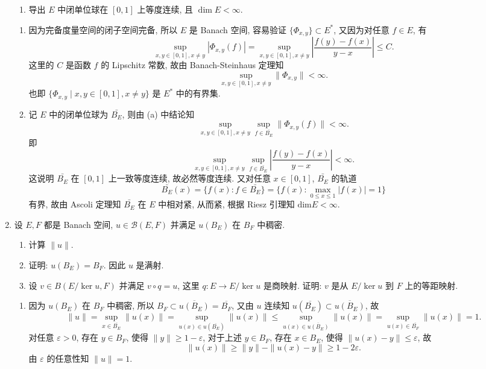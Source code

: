 \begin{enumerate}
\begin{enumerate}
      \item 导出 $E$ 中闭单位球在 $[0,1]$ 上等度连续, 且 $\dim E<\infty$.
    \end{enumerate}
    \begin{answer}
      \begin{enumerate}
        \item 因为完备度量空间的闭子空间完备, 所以 $E$ 是 Banach 空间,
        容易验证 $\{\varPhi_{x,y}\}\subset E^*$, 又因为对任意 $f\in E$, 有
        \[\sup_{x,y\in[0,1],x\neq y}|\varPhi_{x,y}(f)|=\sup_{x,y\in[0,1],x\neq y}\left|\frac{f(y)-f(x)}{y-x}\right|\leq C.\]
        这里的 $C$ 是函数 $f$ 的 Lipschitz 常数, 故由 Banach-Steinhaus 定理知
        \[\sup_{x,y\in[0,1],x\neq y}\|\varPhi_{x,y}\|<\infty.\]
        也即 $\{\varPhi_{x,y}\mid x,y\in[0,1],x\neq y\}$ 是 $E^*$ 中的有界集.
    
        \item 记 $E$ 中的闭单位球为 $\bar{B_E}$, 则由 (a) 中结论知
        \[\sup_{x,y\in[0,1],x\neq y}\sup_{f\in \bar{B_E}}\|\varPhi_{x,y}(f)\|<\infty.\]
        即
        \[\sup_{x,y\in[0,1],x\neq y}\sup_{f\in \bar{B_E}}\left|\frac{f(y)-f(x)}{y-x}\right|<\infty.\]
        这说明 $\bar{B_E}$ 在 $[0,1]$ 上一致等度连续, 故必然等度连续.
        又对任意 $x\in[0,1]$, $\bar{B_E}$ 的轨道
        \[\bar{B_E}(x)=\{f(x):f\in \bar{B_E}\}=\{f(x):\max_{0\leq x\leq 1}|f(x)|=1\}\]
        有界, 故由 Ascoli 定理知 $\bar{B_E}$ 在 $E$ 中相对紧, 从而紧, 根据 Riesz 引理知 $\textrm{dim}E<\infty$.
      \end{enumerate}
    \end{answer}
  \item 设 $E,F$ 都是 Banach 空间, $u\in\mathcal{B}(E,F)$ 并满足 $u(B_E)$ 在 $B_F$ 中稠密.

    \begin{enumerate}
        \item 计算 $\|u\|$.

        \item 证明: $u(B_E)=B_F$. 因此 $u$ 是满射.
    
        \item 设 $v\in B(E/\ker u,F)$ 并满足 $v\circ q=u$, 这里 $q:E\to E/\ker u$
        是商映射. 证明: $v$ 是从 $E/\ker u$ 到 $F$ 上的等距映射.
    \end{enumerate}
    \begin{answer}
      \begin{enumerate}
        \item 因为 $u(B_E)$ 在 $B_F$ 中稠密,
        所以 $B_F\subset\overline{u(B_E)}=\overline{B_F}$,
        又由 $u$ 连续知 $u(\overline{B_E})\subset\overline{u(B_E)}$, 故
        \[\|u\|=\sup_{x\in\overline{B_E}}\|u(x)\|=\sup_{u(x)\in u(\overline{B_E})}\|u(x)\|\leq\sup_{u(x)\in \overline{u(B_E)}}\|u(x)\|=\sup_{u(x)\in\overline{B_F}}\|u(x)\|=1.\]
        对任意 $\varepsilon>0$, 存在 $y\in B_F$,
        使得 $\|y\|\geq 1-\varepsilon$, 对于上述 $y\in B_F$, 存在 $x\in B_E$,
        使得 $\|u(x)-y\|\leq\varepsilon$, 故
        \[\|u(x)\|\geq\|y\|-\|u(x)-y\|\geq 1-2\varepsilon.\]
        由 $\varepsilon$ 的任意性知 $\|u\|=1$.
    

\end{enumerate}
\end{answer}
\end{enumerate}
